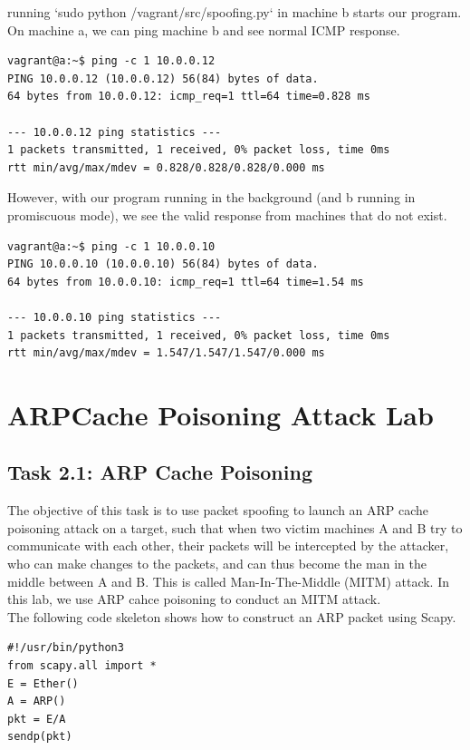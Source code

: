 \documentclass[12pt]{article}
\newcommand\tab[1][0.5cm]{\hspace*{#1}}
\begin{document}
running `sudo python /vagrant/src/spoofing.py` in machine b starts our program. On machine a, we can ping machine b and see normal ICMP response.

\begin{verbatim}
vagrant@a:~$ ping -c 1 10.0.0.12
PING 10.0.0.12 (10.0.0.12) 56(84) bytes of data.
64 bytes from 10.0.0.12: icmp_req=1 ttl=64 time=0.828 ms

--- 10.0.0.12 ping statistics ---
1 packets transmitted, 1 received, 0% packet loss, time 0ms
rtt min/avg/max/mdev = 0.828/0.828/0.828/0.000 ms
\end{verbatim}

However, with our program running in the background (and b running in promiscuous mode), we see the valid response from machines that do not exist.

\begin{verbatim}
vagrant@a:~$ ping -c 1 10.0.0.10
PING 10.0.0.10 (10.0.0.10) 56(84) bytes of data.
64 bytes from 10.0.0.10: icmp_req=1 ttl=64 time=1.54 ms

--- 10.0.0.10 ping statistics ---
1 packets transmitted, 1 received, 0% packet loss, time 0ms
rtt min/avg/max/mdev = 1.547/1.547/1.547/0.000 ms
\end{verbatim}







\section{ARPCache Poisoning Attack Lab}
\subsection{Task 2.1: ARP Cache Poisoning}
The objective of this task is to use packet spoofing to launch an ARP cache poisoning attack on a target,
such that when two victim machines A and B try to communicate with each other, their packets will be
intercepted by the attacker, who can make changes to the packets, and can thus become the man in the
middle between A and B. This is called Man-In-The-Middle (MITM) attack. In this lab, we use ARP cahce
poisoning to conduct an MITM attack. \\
\tab The following code skeleton shows how to construct an ARP packet using Scapy.
\begin{verbatim}
#!/usr/bin/python3
from scapy.all import *
E = Ether()
A = ARP()
pkt = E/A
sendp(pkt)
\end{verbatim}
\end{document}
